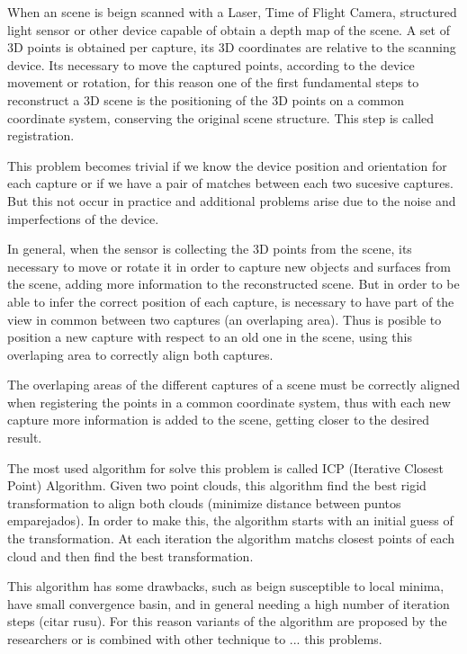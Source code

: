 When an scene is beign scanned with a Laser, Time of Flight Camera, structured 
light sensor or other device capable of obtain a depth map of the scene.
 A set of 3D points is obtained per capture, its 3D coordinates 
are relative to the scanning device. Its necessary to move the captured points, 
according to the device movement or rotation, for this reason 
one of the first fundamental steps to reconstruct a 3D scene is the 
positioning of the 3D points on a common coordinate system, conserving 
the original scene structure. This step is called registration. 

This problem becomes trivial if we know the device position and orientation 
for each capture or if we have a pair of matches between each two sucesive 
captures. But this not occur in practice and additional problems arise due 
to the noise and imperfections of the device.


In general, when the sensor is collecting the 3D points from the scene, 
 its necessary to move or rotate it in order to capture new objects and surfaces from 
the scene, adding more information to the reconstructed scene. But in order to be 
able to infer the correct position of each capture, is necessary to have part 
of the view in common between two captures (an overlaping area). Thus is posible 
to position a new capture with respect to an old one in the scene, using this overlaping 
area to correctly align both captures.
 
The overlaping areas of the different captures of a scene must be correctly 
aligned when registering the points in a common coordinate system, 
thus with each new capture more information is added to the scene, 
getting closer to the desired result. 

The most used algorithm for solve this problem is called 
ICP (Iterative Closest Point) Algorithm. Given two point clouds, 
this algorithm find the best rigid transformation to align both clouds 
(minimize distance between puntos emparejados). In order to make this, 
the algorithm starts with an initial guess of the transformation. 
At each iteration the algorithm matchs closest points of each cloud and then 
find the best transformation. 

This algorithm has some drawbacks, such as beign susceptible to local minima, 
have small convergence basin, and in general needing a high number of iteration
 steps (citar rusu). For this reason variants of the algorithm are proposed by 
the researchers or is combined with other technique to ... this problems.







